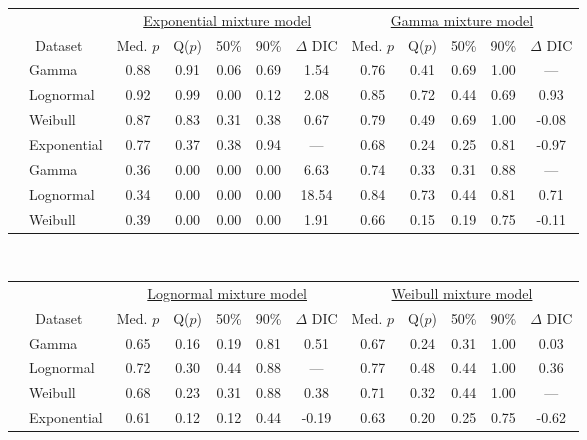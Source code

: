 \documentclass[useAMS,usenatbib,referee,12pt]{article}
\begin{document}
\begin{table}[ht]
\small\centering
\begin{tabular}{l|l|ccccc|ccccc}
 \multicolumn{2}{c}{ } & \multicolumn{5}{c}{\underline{Exponential mixture model}} & \multicolumn{5}{c}{\underline{Gamma mixture model}} \\
 \multicolumn{2}{c}{Dataset} & Med. $p$ & Q($p$) & 50\% & 90\% & $\Delta$ DIC & Med. $p$ & Q($p$) & 50\% & 90\% & $\Delta$ DIC \\ 
  \hline
\parbox[t]{2mm}{} & Gamma & 0.88 & 0.91 & 0.06 & 0.69 & 1.54 & 0.76 & 0.41 & 0.69 & 1.00 & --- \\ 
&   Lognormal & 0.92 & 0.99 & 0.00 & 0.12 & 2.08 & 0.85 & 0.72 & 0.44 & 0.69 & 0.93 \\ 
&   Weibull & 0.87 & 0.83 & 0.31 & 0.38 & 0.67 & 0.79 & 0.49 & 0.69 & 1.00 & -0.08 \\ 
&   Exponential & 0.77 & 0.37 & 0.38 & 0.94 & --- & 0.68 & 0.24 & 0.25 & 0.81 & -0.97 \\ 
\parbox[t]{2mm}{} & Gamma & 0.36 & 0.00 & 0.00 & 0.00 & 6.63 & 0.74 & 0.33 & 0.31 & 0.88 & --- \\ 
&   Lognormal & 0.34 & 0.00 & 0.00 & 0.00 & 18.54 & 0.84 & 0.73 & 0.44 & 0.81 & 0.71 \\ 
&   Weibull & 0.39 & 0.00 & 0.00 & 0.00 & 1.91 & 0.66 & 0.15 & 0.19 & 0.75 & -0.11 \\
   \hline
\end{tabular}
\vspace{0.5cm}\\
\begin{tabular}{l|l|ccccc|ccccc}
 \multicolumn{2}{c}{ } & \multicolumn{5}{c}{\underline{Lognormal mixture model}} & \multicolumn{5}{c}{\underline{Weibull mixture model}} \\
 \multicolumn{2}{c}{Dataset} & Med. $p$ & Q($p$) & 50\% & 90\% & $\Delta$ DIC & Med. $p$ & Q($p$) & 50\% & 90\% & $\Delta$ DIC \\ 
  \hline
\parbox[t]{2mm}{} & Gamma & 0.65 & 0.16 & 0.19 & 0.81 & 0.51 & 0.67 & 0.24 & 0.31 & 1.00 & 0.03 \\ 
&   Lognormal & 0.72 & 0.30 & 0.44 & 0.88 & --- & 0.77 & 0.48 & 0.44 & 1.00 & 0.36 \\ 
&   Weibull & 0.68 & 0.23 & 0.31 & 0.88 & 0.38 & 0.71 & 0.32 & 0.44 & 1.00 & --- \\ 
&   Exponential & 0.61 & 0.12 & 0.12 & 0.44 & -0.19 & 0.63 & 0.20 & 0.25 & 0.75 & -0.62 \\ 

\end{tabular}
\end{table}
\end{document}
